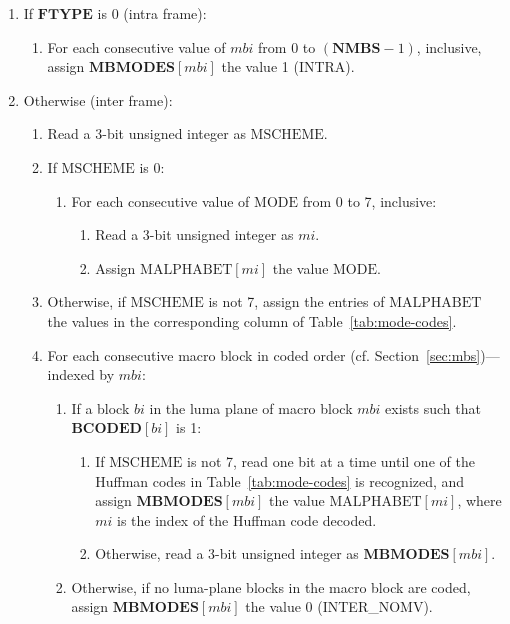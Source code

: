\documentclass[9pt,letterpaper]{book}
\newcommand{\idx}[1]{{\ensuremath{\mathit{#1}}}}
\newcommand{\bi}{\idx{bi}}
\newcommand{\mbi}{\idx{mbi}}
\newcommand{\mi}{\idx{mi}}
\newcommand{\bitvar}[1]{\ensuremath{\mathbf{\bm{#1}}}}
\newcommand{\locvar}[1]{\ensuremath{\mathrm{#1}}}
\numberwithin{equation}{chapter}
\numberwithin{figure}{chapter}
\numberwithin{table}{chapter}
\begin{document}
\begin{enumerate}
\item
If \bitvar{FTYPE} is 0 (intra frame):
\begin{enumerate}
\item
For each consecutive value of \locvar{\mbi} from 0 to $(\bitvar{NMBS}-1)$,
 inclusive, assign $\bitvar{MBMODES}[\mbi]$ the value 1 (INTRA).
\end{enumerate}
\item
Otherwise (inter frame):
\begin{enumerate}
\item
Read a 3-bit unsigned integer as \locvar{MSCHEME}.
\item
If \locvar{MSCHEME} is 0:
\begin{enumerate}
\item
For each consecutive value of \locvar{MODE} from 0 to 7, inclusive:
\begin{enumerate}
\item
Read a 3-bit unsigned integer as \locvar{\mi}.
\item
Assign $\locvar{MALPHABET}[\mi]$ the value \locvar{MODE}.
\end{enumerate}
\end{enumerate}
\item
Otherwise, if \locvar{MSCHEME} is not 7, assign the entries of
 \locvar{MALPHABET} the values in the corresponding column of
 Table~\ref{tab:mode-codes}.
\item
For each consecutive macro block in coded order (cf.
 Section~\ref{sec:mbs})---indexed by \locvar{\mbi}:
\begin{enumerate}
\item
If a block \locvar{\bi} in the luma plane of macro block \locvar{\mbi} exists
 such that $\bitvar{BCODED}[\locvar{\bi}]$ is 1:
\begin{enumerate}
\item
If \locvar{MSCHEME} is not 7, read one bit at a time until one of the Huffman
 codes in Table~\ref{tab:mode-codes} is recognized, and assign
 $\bitvar{MBMODES}[\locvar{\mbi}]$ the value
 $\locvar{MALPHABET}[\locvar{\mi}]$, where \locvar{\mi} is the index of the
 Huffman code decoded.
\item
Otherwise, read a 3-bit unsigned integer as $\bitvar{MBMODES}[\locvar{\mbi}]$.
\end{enumerate}
\item
Otherwise, if no luma-plane blocks in the macro block are coded, assign
 $\bitvar{MBMODES}[\locvar{\mbi}]$ the value 0 (INTER\_NOMV).
\end{enumerate}
\end{enumerate}
\end{enumerate}
\end{document}
